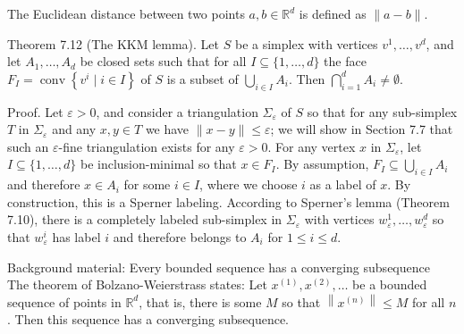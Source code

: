 \documentclass[12pt]{article}
\begin{document}
The Euclidean distance between two points $a, b \in \mathbb{R}^{d}$ is defined as $\|a-b\|$.

Theorem 7.12 (The KKM lemma). Let $S$ be a simplex with vertices $v^{1}, \ldots, v^{d}$, and let $A_{1}, \ldots, A_{d}$ be closed sets such that for all $I \subseteq\{1, \ldots, d\}$ the face $F_{I}=\operatorname{conv}\left\{v^{i} \mid i \in I\right\}$ of $S$ is a subset of $\bigcup_{i \in I} A_{i}$. Then $\bigcap_{i=1}^{d} A_{i} \neq \emptyset$.

Proof. Let $\varepsilon>0$, and consider a triangulation $\Sigma_{\varepsilon}$ of $S$ so that for any sub-simplex $T$ in $\Sigma_{\varepsilon}$ and any $x, y \in T$ we have $\|x-y\| \leq \varepsilon$; we will show in Section 7.7 that such an $\varepsilon$-fine triangulation exists for any $\varepsilon>0$. For any vertex $x$ in $\Sigma_{\varepsilon}$, let $I \subseteq\{1, \ldots, d\}$ be inclusion-minimal so that $x \in F_{I}$. By assumption, $F_{I} \subseteq \bigcup_{i \in I} A_{i}$ and therefore $x \in A_{i}$ for some $i \in I$, where we choose $i$ as a label of $x$. By construction, this is a Sperner labeling. According to Sperner's lemma (Theorem 7.10), there is a completely labeled sub-simplex in $\Sigma_{\varepsilon}$ with vertices $w_{\varepsilon}^{1}, \ldots, w_{\varepsilon}^{d}$ so that $w_{\varepsilon}^{i}$ has label $i$ and therefore belongs to $A_{i}$ for $1 \leq i \leq d$.

Background material: Every bounded sequence has a converging subsequence\\
The theorem of Bolzano-Weierstrass states: Let $x^{(1)}, x^{(2)}, \ldots$ be a bounded sequence of points in $\mathbb{R}^{d}$, that is, there is some $M$ so that $\left\|x^{(n)}\right\| \leq M$ for all $n$. Then this sequence has a converging subsequence.
\end{document}
